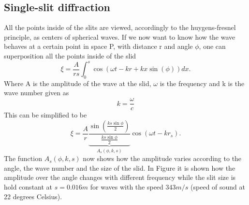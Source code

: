 \subsection{Single-slit diffraction}
All the points inside of the slits are viewed, accordingly to the huygens-fresnel principle, as centers of spherical waves. If we now want to know how the wave behaves at a certain point in space P, with distance r and angle $\phi$, one can superposition all the points inside of the slid
\begin{equation}
    \xi  = \frac{A}{rs}\int_0^s \cos \left ( \omega t - k r + k x \sin\left ( \phi\right )\right) dx.
\end{equation}
Where A is the amplitude of the wave at the slid, $\omega$ is the frequency and k is the wave number given as
\begin{equation}
    k = \frac{\omega}{c}
\end{equation}
This can be simplified to be
\begin{equation}
    \xi = \frac{A}{r}  \underbrace{\frac{\sin \left ( \frac{ks \sin \phi}{2}\right )}{ \frac{ks \sin \phi}{2}}}_{A_s(\phi,k,s)} \cos \left ( \omega t - k r_s\right ).
\end{equation}
The function $A_s(\phi,k,s)$ now shows how the amplitude varies according to the angle, the wave number and the size of the slid. In Figure  it is shown how the amplitude over the angle changes with different frequency while the slit size is hold constant at $s = 0.016m$ for waves with the speed $343m/s$ (speed of sound at 22 degrees Celsius).
